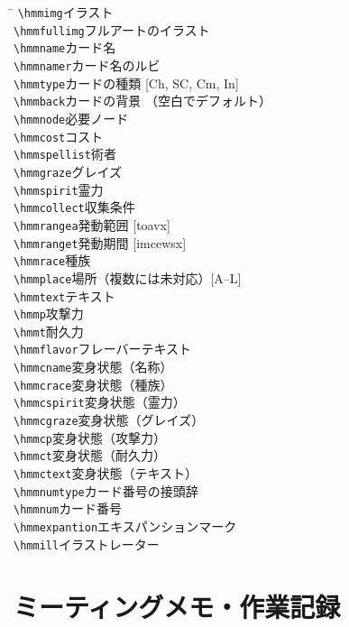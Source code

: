 \documentclass[line_length=22zw,number_of_lines=45,twocolumn]{jlreq}
\begin{document}
\begin{tabbing}
	\hspace{.4\linewidth}\=\kill
	\verb+\hmmimg+\>イラスト\\
	\verb+\hmmfullimg+\>フルアートのイラスト\\
	\verb+\hmmname+\>カード名\\
	\verb+\hmmnamer+\>カード名のルビ\\
	\verb+\hmmtype+\>カードの種類 [Ch, SC, Cm, In]\\
	\verb+\hmmback+\>カードの背景 （空白でデフォルト）\\
	\verb+\hmmnode+\>必要ノード\\
	\verb+\hmmcost+\>コスト\\
	\verb+\hmmspellist+\>術者\\
	\verb+\hmmgraze+\>グレイズ\\
	\verb+\hmmspirit+\>霊力\\
	\verb+\hmmcollect+\>収集条件\\
	\verb+\hmmrangea+\>発動範囲 [toavx]\\
	\verb+\hmmranget+\>発動期間 [imcewsx]\\
	\verb+\hmmrace+\>種族\\
	\verb+\hmmplace+\>場所（複数には未対応）[A--L]\\
	\verb+\hmmtext+\>テキスト\\
	\verb+\hmmp+\>攻撃力\\
	\verb+\hmmt+\>耐久力\\
	\verb+\hmmflavor+\>フレーバーテキスト\\
	\verb+\hmmcname+\>変身状態（名称）\\
	\verb+\hmmcrace+\>変身状態（種族）\\
	\verb+\hmmcspirit+\>変身状態（霊力）\\
	\verb+\hmmcgraze+\>変身状態（グレイズ）\\
	\verb+\hmmcp+\>変身状態（攻撃力）\\
	\verb+\hmmct+\>変身状態（耐久力）\\
	\verb+\hmmctext+\>変身状態（テキスト）\\
	\verb+\hmmnumtype+\>カード番号の接頭辞\\
	\verb+\hmmnum+\>カード番号\\
	\verb+\hmmexpantion+\>エキスパンションマーク\\
	\verb+\hmmill+\>イラストレーター\\
\end{tabbing}

\section{ミーティングメモ・作業記録}
\end{document}
